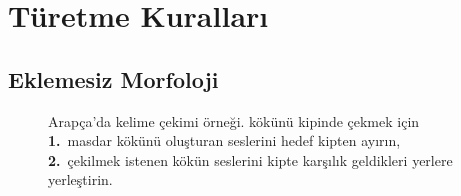 
\chapter{Türetme Kuralları}

\section{Eklemesiz Morfoloji}

\begin{figure}[htbp]
  \centering
  
  \caption{Arapça'da kelime çekimi örneği.
    \fmtkok{\Lnun\Lvav\Lre} kökünü
     kipinde çekmek için \textbf{1.}\ masdar kökünü oluşturan \masdarkok
    seslerini hedef kipten ayırın, \textbf{2.}\ çekilmek istenen kökün seslerini
    kipte karşılık geldikleri yerlere yerleştirin.}
  \label{fig:fig2}
\end{figure}


% 



